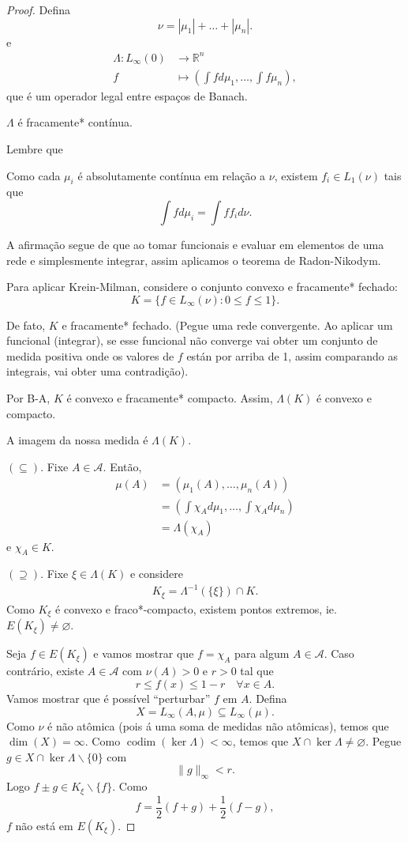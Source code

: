 \documentclass[portuguese]{article}
\theoremstyle{definition}
\newcommand{\R}{\mathbb{R}}
\begin{document}
\begin{proof}
	Defina
	\[\nu=|\mu_1|+\ldots+|\mu_n|.\]
	e
	\begin{align*}
		\Lambda:L_\infty(0)&\to\R^n\\
		f&\mapsto\left(\int fd\mu_1,\ldots,\int f\mu_n\right),
	\end{align*}
	que é um operador legal entre espaços de Banach.
	\begin{af*}
		$\Lambda$ é fracamente* contínua.
	\end{af*}
	Lembre que
	\begin{teo}
		Como cada $\mu_i$ é absolutamente contínua em relação a $\nu$, existem $f_i\in L_1(\nu)$ tais que
		\[\int fd\mu_i=\int ff_id\nu.\]
	\end{teo}
	A afirmação segue de que ao tomar funcionais e evaluar em elementos de uma rede e simplesmente integrar, assim aplicamos o teorema de Radon-Nikodym.
	
	Para aplicar Krein-Milman, considere o conjunto convexo e fracamente* fechado:
	\[K=\{f\in L_\infty(\nu):0\leq f\leq1\}.\]
	\begin{exer*}
		De fato, $K$ e fracamente* fechado. (Pegue uma rede convergente. Ao aplicar um funcional (integrar), se esse funcional não converge vai obter um conjunto de medida positiva onde os valores de $f$ están por arriba de 1, assim comparando as integrais, vai obter uma contradição).
	\end{exer*}
	Por B-A, $K$ é convexo e fracamente* compacto. Assim, $\Lambda(K)$ é convexo e compacto.
	\begin{af*}
		A imagem da nossa medida é $\Lambda(K)$.
	\end{af*}
	$(\subseteq)$. Fixe $A\in\mathcal{A}$. Então,
	\begin{align*}
		\mu(A)&=(\mu_1(A),\ldots,\mu_n(A))\\
		&=\left(\int\chi_Ad\mu_1,\ldots,\int\chi_Ad\mu_n\right)\\
		&=\Lambda(\chi_A)
	\end{align*}
	e $\chi_A\in K$.
	
	$(\supseteq)$. Fixe $\xi\in\Lambda(K)$ e considere
	\begin{align*}
		K_\xi=\Lambda^{-1}(\{\xi\})\cap K.
	\end{align*}
	Como $K_\xi$ é convexo e fraco*-compacto, existem pontos extremos, ie. $E(K_\xi)\neq\varnothing$.
	
	Seja $f\in E(K_\xi)$ e vamos mostrar que $f=\chi_A$ para algum $A\in\mathcal{A}$. Caso contrário, existe $A\in\mathcal{A}$ com $\nu(A)>0$ e $r>0$ tal que 
	\[r\leq f(x)\leq 1-r\quad\forall x\in A.\]
	Vamos mostrar que é possível ``perturbar'' $f$ em $A$. Defina
	\[X=L_\infty(A,\mu)\subseteq L_\infty(\mu).\]
	Como $\nu$ é não atômica (pois á uma soma de medidas não atômicas), temos que $\dim (X)=\infty$. Como $\operatorname{codim}(\ker\Lambda)<\infty$, temos que $X\cap\ker\Lambda\neq\varnothing$. Pegue $g\in X\cap \ker\Lambda\backslash\{0\}$ com
	\[\|g\|_\infty<r.\]
	Logo $f\pm g\in K_\xi\backslash\{f\}$. Como
	\[f=\frac{1}{2}(f+g)+\frac{1}{2}(f-g),\]
	$f$ não está em $E(K_\xi)$.
\end{proof}
\end{document}
